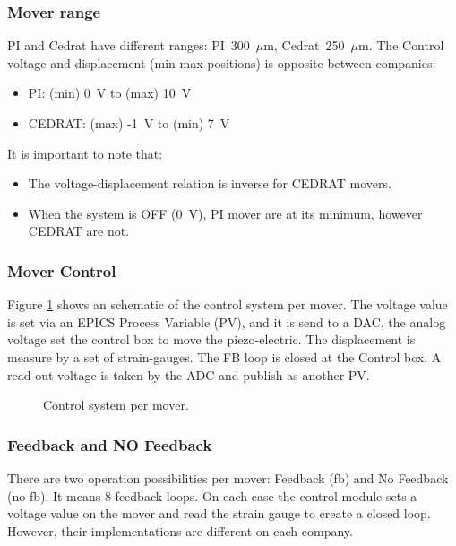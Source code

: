 \subsubsection{Mover range}
PI and Cedrat have different ranges: PI~300~$\mu$m, Cedrat~250~$\mu$m. The Control voltage and displacement (min-max positions) is opposite between companies:\par
\begin{itemize}
\item PI: (min) 0~V to (max) 10~V
\item CEDRAT: (max) -1~V to (min) 7~V
\end{itemize}
It is important to note that:
\begin{itemize}
\item The voltage-displacement relation is inverse for CEDRAT movers.
\item When the system is OFF (0~V), PI mover are at its minimum, however CEDRAT are not.
\end{itemize}
\subsubsection{Mover Control}
Figure \ref{f:movercontrol} shows an schematic of the control system per mover. The voltage value is set via an EPICS Process Variable (PV), and it is send to a DAC, the analog voltage set the control box to move the piezo-electric. The displacement is measure by a set of strain-gauges. The FB loop is closed at the Control box. A read-out voltage is taken by the ADC and publish as another PV.\par
\begin{figure}[hbt]
\centering
{}\caption{Control system per mover.}\label{f:movercontrol}
\end{figure}
\subsubsection{Feedback and NO Feedback}
There are two operation possibilities per mover: Feedback (fb) and No Feedback (no fb). It means 8 feedback loops. On each case the control module sets a voltage value on the mover and read the strain gauge to create a closed loop. However, their implementations are different on each company.
